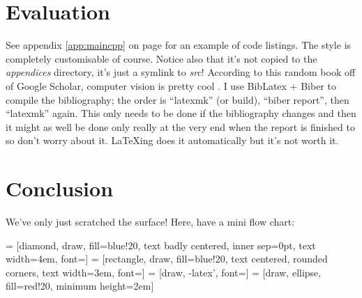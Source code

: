 \documentclass[a4paper,12pt,notitlepage]{article}
\begin{document}
\pagebreak

\section{Evaluation}
	
	See appendix \ref{app:maincpp} on page \pageref{app:maincpp} for an example of code listings. The style is completely customisable of course. Notice also that it's not copied to the \emph{appendices} directory, it's just a symlink to \emph{src}! According to this random book off of Google Scholar, computer vision is pretty cool \autocite{forsyth2002computer}. I use BibLatex + Biber to compile the bibliography; the order is ``latexmk'' (or build), ``biber report'', then ``latexmk'' again. This only needs to be done if the bibliography changes and then it might as well be done only really at the very end when the report is finished to so don't worry about it. LaTeXing does it automatically but it's not worth it.

\pagebreak

\section{Conclusion}

	We've only just scratched the surface! Here, have a mini flow chart:

	 = [diamond, draw, fill=blue!20, text badly centered, inner sep=0pt, text width=4em, font=\tiny]
	 = [rectangle, draw, fill=blue!20, text centered, rounded corners, text width=3em, font=\tiny]
	 = [draw, -latex', font=\tiny]
	 = [draw, ellipse, fill=red!20, minimum height=2em]
	
\end{document}
